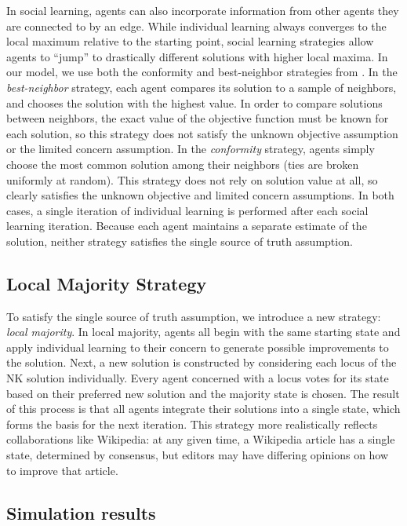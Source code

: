 In social learning,
agents can also incorporate information from
other agents they are connected to by an edge.
While individual learning always converges to the local maximum relative to the starting point,
social learning strategies allow agents to ``jump'' to drastically different solutions with higher local maxima.
In our model, we use both the conformity and best-neighbor strategies from \cite{barkoczi_social_2016}.
In the {\em best-neighbor} strategy, each agent compares its solution to a sample of neighbors, and chooses the solution with the highest value.
In order to compare solutions between neighbors,
the exact value of the objective function must be known for each solution,
so this strategy does not satisfy the unknown objective assumption
or the limited concern assumption.
In the {\em conformity} strategy, agents simply choose the most common solution among their neighbors
(ties are broken uniformly at random).
This strategy does not rely on solution value at all, so clearly satisfies the
unknown objective and limited concern assumptions.
In both cases, a single iteration of individual learning is performed after each social learning
iteration.
Because each agent maintains a separate estimate of the solution,
neither strategy satisfies the single source of truth assumption.

\subsection{Local Majority Strategy}

To satisfy the single source of truth assumption,
we introduce a new strategy: {\em local majority}.
In local majority, agents all begin with the same starting state and apply individual learning to their concern to generate
possible improvements to the solution.
Next, a new solution is constructed by considering each locus of the NK solution
individually.
Every agent concerned with a locus votes for its state based on their preferred
new solution and the majority state is chosen.
The result of this process is that all agents integrate their solutions into
a single state,
which forms the basis for the next iteration.
This strategy more realistically reflects collaborations like Wikipedia:
at any given time, a Wikipedia article has a single state, determined by consensus,
but editors may have differing opinions on how to improve that article.

\subsection{Simulation results}

